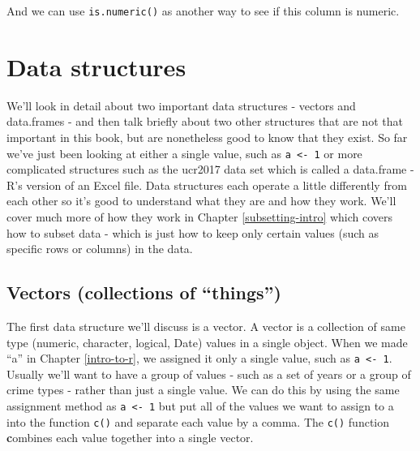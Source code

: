 \documentclass[
]{krantz}
\makeatletter
\newenvironment{Shaded}{\begin{snugshade}}{\end{snugshade}}
\newcommand{\CommentTok}[1]{\textcolor[rgb]{0.37,0.37,0.37}{\textit{#1}}}
\newcommand{\FunctionTok}[1]{\textcolor[rgb]{0,0,0}{#1}}
\newcommand{\NormalTok}[1]{#1}
\newcommand{\SpecialCharTok}[1]{\textcolor[rgb]{0,0,0}{#1}}
\newenvironment{kframe}{%
\medskip{}
\setlength{\fboxsep}{.8em}
 \def\at@end@of@kframe{}%
 \ifinner\ifhmode%
  \def\at@end@of@kframe{\end{minipage}}%
  \begin{minipage}{\columnwidth}%
 \fi\fi%
 \def\FrameCommand##1{\hskip\@totalleftmargin \hskip-\fboxsep
 \colorbox{shadecolor}{##1}\hskip-\fboxsep
     \hskip-\linewidth \hskip-\@totalleftmargin \hskip\columnwidth}%
 \MakeFramed {\advance\hsize-\width
   \@totalleftmargin\z@ \linewidth\hsize
   \@setminipage}}%
 {\par\unskip\endMakeFramed%
 \at@end@of@kframe}
\renewenvironment{Shaded}{\begin{kframe}}{\end{kframe}}
\makeatother
\begin{document}
\begin{Shaded}
\end{Shaded}

And we can use \texttt{is.numeric()} as another way to see
if this column is numeric.

\begin{Shaded}
\end{Shaded}

\hypertarget{data-structures}{%
\section{Data structures}\label{data-structures}}

We'll look in detail about two important data structures -
vectors and data.frames - and then talk briefly about two
other structures that are not that important in this book,
but are nonetheless good to know that they exist. So far
we've just been looking at either a single value, such as
\texttt{a\ \textless{}-\ 1} or more complicated structures
such as the ucr2017 data set which is called a data.frame -
R's version of an Excel file. Data structures each operate a
little differently from each other so it's good to
understand what they are and how they work. We'll cover much
more of how they work in Chapter \ref{subsetting-intro}
which covers how to subset data - which is just how to keep
only certain values (such as specific rows or columns) in
the data.

\hypertarget{vectors}{%
\subsection{Vectors (collections of
``things'')}\label{vectors}}

The first data structure we'll discuss is a vector. A vector
is a collection of same type (numeric, character, logical,
Date) values in a single object. When we made ``a'' in
Chapter \ref{intro-to-r}, we assigned it only a single
value, such as \texttt{a\ \textless{}-\ 1}. Usually we'll
want to have a group of values - such as a set of years or a
group of crime types - rather than just a single value. We
can do this by using the same assignment method as
\texttt{a\ \textless{}-\ 1} but put all of the values we
want to assign to a into the function \texttt{c()} and
separate each value by a comma. The \texttt{c()} function
\textbf{c}ombines each value together into a single vector.
\end{document}
